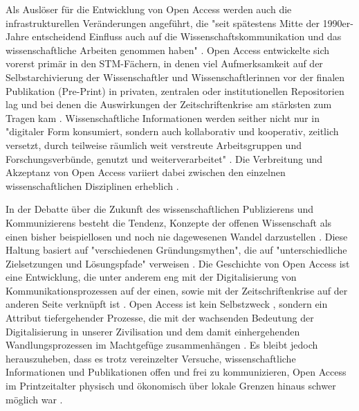Als Auslöser für die Entwicklung von Open Access werden auch die infrastrukturellen Veränderungen angeführt, die "seit spätestens Mitte der 1990er-Jahre entscheidend Einfluss auch auf die Wissenschaftskommunikation und das wissenschaftliche Arbeiten genommen haben" \cite{schulze_2013_open}. Open Access entwickelte sich vorerst primär in den STM-Fächern, in denen viel Aufmerksamkeit auf der Selbstarchivierung der Wissenschaftler und Wissenschaftlerinnen vor der finalen Publikation (Pre-Print) in privaten, zentralen oder institutionellen Repositorien lag \cite{adema_2013_political} und bei denen die Auswirkungen der Zeitschriftenkrise am stärksten zum Tragen kam \cite{naeder_2010_open}. Wissenschaftliche Informationen werden seither nicht nur in "digitaler Form konsumiert, sondern auch kollaborativ und kooperativ, zeitlich versetzt, durch teilweise räumlich weit verstreute Arbeitsgruppen und Forschungsverbünde, genutzt und weiterverarbeitet" \cite{schulze_2013_open}. Die Verbreitung und Akzeptanz von Open Access variiert dabei zwischen den einzelnen wissenschaftlichen Disziplinen erheblich \cite{cite:21a}.

In der Debatte über die Zukunft des wissenschaftlichen Publizierens und Kommunizierens besteht die Tendenz, Konzepte der offenen Wissenschaft als einen bisher beispiellosen und noch nie dagewesenen Wandel darzustellen \cite{cite:17a} \cite{cite:17b}. Diese Haltung basiert auf "verschiedenen Gründungsmythen", die auf "unterschiedliche Zielsetzungen und Lösungspfade" verweisen \cite{suchen-Hoffmann-Zugang-undVerwertung-oeffentlicher-Informationen}. Die Geschichte von Open Access ist eine Entwicklung, die unter anderem eng mit der Digitalisierung von Kommunikationsprozessen auf der einen, sowie mit der Zeitschriftenkrise auf der anderen Seite verknüpft ist \cite{suchen-Hoffmann-Zugang-undVerwertung-oeffentlicher-Informationen} \cite{yiotis_2013_open} \cite{wein_2010_erwerbung}. Open Access ist kein Selbstzweck \cite{cite:17d}, sondern ein Attribut tiefergehender Prozesse, die mit der wachsenden Bedeutung der Digitalisierung in unserer Zivilisation und dem damit einhergehenden Wandlungsprozessen im Machtgefüge zusammenhängen \cite{cite:17e}. Es bleibt jedoch herauszuheben, dass es trotz vereinzelter Versuche, wissenschaftliche Informationen und Publikationen offen und frei zu kommunizieren, Open Access im Printzeitalter physisch und ökonomisch über lokale Grenzen hinaus schwer möglich war \cite{cite:18a}.

